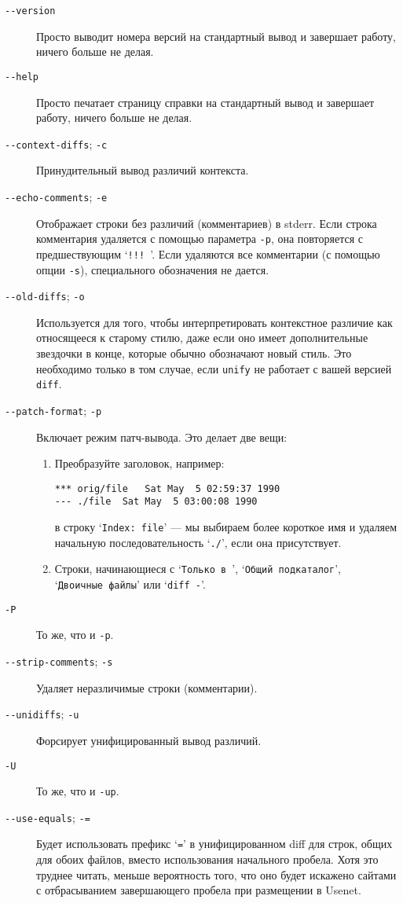 \begin{description}
\item[\texttt{-\/-version}]
Просто выводит номера версий на стандартный вывод и завершает работу,
ничего больше не делая.
\item[\texttt{-\/-help}]
Просто печатает страницу справки на стандартный вывод и завершает
работу, ничего больше не делая.
\item[\texttt{-\/-context-diffs}; \texttt{-c}]
Принудительный вывод различий контекста.
\item[\texttt{-\/-echo-comments}; \texttt{-e}]
Отображает строки без различий (комментариев) в stderr. Если строка
комментария удаляется с помощью параметра \texttt{-p}, она повторяется с
предшествующим `\texttt{!!!\ }'. Если удаляются все комментарии (с
помощью опции \texttt{-s}), специального обозначения не дается.
\item[\texttt{-\/-old-diffs}; \texttt{-o}]
Используется для того, чтобы интерпретировать контекстное различие как
относящееся к старому стилю, даже если оно имеет дополнительные
звездочки в конце, которые обычно обозначают новый стиль. Это необходимо
только в том случае, если \texttt{unify} не работает с вашей версией
\texttt{diff}.
\item[\texttt{-\/-patch-format}; \texttt{-p}]
Включает режим патч-вывода. Это делает две вещи:

\begin{enumerate}
\def\labelenumi{\arabic{enumi}.}
\item
  Преобразуйте заголовок, например:

\begin{verbatim}
*** orig/file   Sat May  5 02:59:37 1990
--- ./file  Sat May  5 03:00:08 1990
\end{verbatim}

  в строку `\texttt{Index:\ file}' --- мы выбираем более короткое имя и
  удаляем начальную последовательность `\texttt{./}', если она
  присутствует.
\item
  Строки, начинающиеся с `\texttt{Только\ в\ }',
  `\texttt{Общий\ подкаталог}', `\texttt{Двоичные\ файлы}' или
  `\texttt{diff\ -}'.
\end{enumerate}
\item[\texttt{-P}]
То же, что и \texttt{-p}.
\item[\texttt{-\/-strip-comments}; \texttt{-s}]
Удаляет неразличимые строки (комментарии).
\item[\texttt{-\/-unidiffs}; \texttt{-u}]
Форсирует унифицированный вывод различий.
\item[\texttt{-U}]
То же, что и \texttt{-up}.
\item[\texttt{-\/-use-equals}; \texttt{-=}]
Будет использовать префикс `\texttt{=}' в унифицированном diff для
строк, общих для обоих файлов, вместо использования начального пробела.
Хотя это труднее читать, меньше вероятность того, что оно будет искажено
сайтами с отбрасыванием завершающего пробела при размещении в Usenet.
\end{description}

